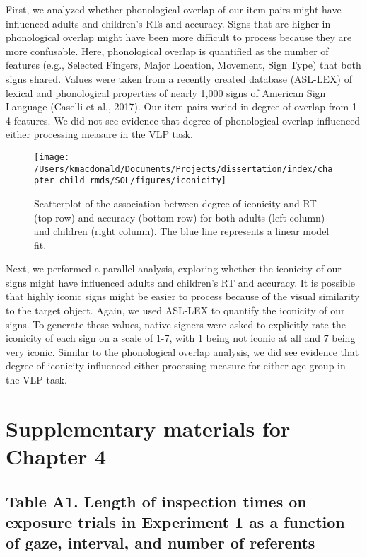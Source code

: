 \documentclass[oneside]{report}
\begin{document}
First, we analyzed whether phonological overlap of our item-pairs might
have influenced adults and children's RTs and accuracy. Signs that are
higher in phonological overlap might have been more difficult to process
because they are more confusable. Here, phonological overlap is
quantified as the number of features (e.g., Selected Fingers, Major
Location, Movement, Sign Type) that both signs shared. Values were taken
from a recently created database (ASL-LEX) of lexical and phonological
properties of nearly 1,000 signs of American Sign Language (Caselli et
al., 2017). Our item-pairs varied in degree of overlap from 1-4
features. We did not see evidence that degree of phonological overlap
influenced either processing measure in the VLP task.
\begin{figure}[t]

{\centering \texttt{[image: /Users/kmacdonald/Documents/Projects/dissertation/index/chapter\_child\_rmds/SOL/figures/iconicity]} 

}

\caption[association between degree of iconicity and RT/Accuracy.]{Scatterplot of the association between degree of iconicity and RT (top row) and accuracy (bottom row) for both adults (left column) and children (right column). The blue line represents a linear model fit.}\label{fig:unnamed-chunk-13}
\end{figure}
Next, we performed a parallel analysis, exploring whether the iconicity
of our signs might have influenced adults and children's RT and
accuracy. It is possible that highly iconic signs might be easier to
process because of the visual similarity to the target object. Again, we
used ASL-LEX to quantify the iconicity of our signs. To generate these
values, native signers were asked to explicitly rate the iconicity of
each sign on a scale of 1-7, with 1 being not iconic at all and 7 being
very iconic. Similar to the phonological overlap analysis, we did see
evidence that degree of iconicity influenced either processing measure
for either age group in the VLP task.

\hypertarget{supplementary-materials-for-chapter-4}{%
\chapter{Supplementary materials for Chapter
4}\label{supplementary-materials-for-chapter-4}}

\captionsetup[table]{labelformat=empty}

\section*{Table A1. Length of inspection times on exposure trials in Experiment 1 as a function of gaze, interval, and number of referents}
\end{document}
